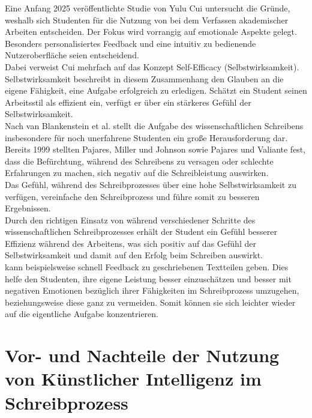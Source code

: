 \documentclass[../main.tex]{subfiles}
\begin{document}
Eine Anfang 2025 veröffentlichte Studie von Yulu Cui untersucht die Gründe, weshalb sich Studenten für die Nutzung von 
 bei dem Verfassen akademischer Arbeiten entscheiden. Der Fokus wird vorrangig auf emotionale 
Aspekte gelegt. Besonders personalisiertes Feedback und eine intuitiv zu bedienende Nutzeroberfläche seien entscheidend.\cite{influencingUsingAi} \\
Dabei verweist Cui mehrfach auf das Konzept Self-Efficacy (Selbstwirksamkeit). Selbstwirksamkeit beschreibt in diesem Zusammenhang den Glauben 
an die eigene Fähigkeit, eine Aufgabe erfolgreich zu erledigen. Schätzt ein Student seinen Arbeitsstil als effizient ein, 
verfügt er über ein stärkeres Gefühl der Selbstwirksamkeit.\cite{influencingUsingAi,SelfEfficacyBeliefs}\\
Nach van Blankenstein et al. stellt die Aufgabe des wissenschaftlichen Schreibens insbesondere für noch unerfahrene Studenten 
ein große Herausforderung dar. Bereits 1999 stellten Pajares, Miller und Johnson sowie Pajares und Valiante fest,
dass die Befürchtung, während des Schreibens zu versagen oder schlechte Erfahrungen zu machen, sich negativ auf die Schreibleistung 
auswirken.\cite{writingSelfBeliefs,writingSelfBeliefsMiddleSchool}\\
Das Gefühl, während des Schreibprozesses über eine hohe Selbstwirksamkeit zu verfügen, vereinfache den 
Schreibprozess und führe somit zu besseren Ergebnissen.\cite{SelfEfficacyBeliefs} \\
Durch den richtigen Einsatz von  während verschiedener Schritte des wissenschaftlichen Schreibprozesses erhält der Student
ein Gefühl besserer Effizienz während des Arbeitens, was sich positiv auf das Gefühl der Selbstwirksamkeit und damit auf den Erfolg
beim Schreiben auswirkt.\\
 kann beispielsweise schnell Feedback zu geschriebenen Textteilen geben. Dies helfe den Studenten, ihre eigene 
Leistung besser einzuschätzen und besser mit negativen Emotionen bezüglich ihrer Fähigkeiten im Schreibprozess umzugehen, beziehungsweise diese ganz zu vermeiden. Somit 
können sie sich leichter wieder auf die eigentliche Aufgabe konzentrieren.\cite{SelfEfficacyBeliefs} 



\section{Vor- und Nachteile der Nutzung von Künstlicher Intelligenz im Schreibprozess}
\end{document}

